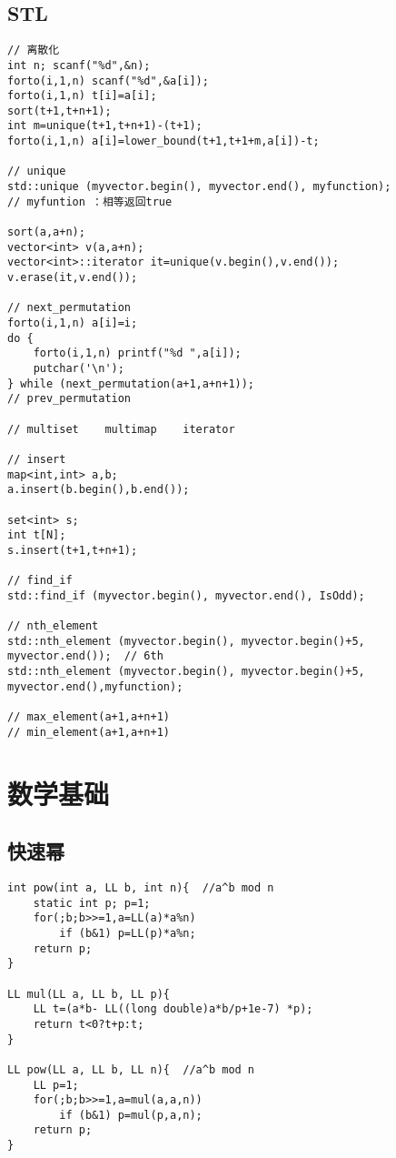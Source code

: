 \documentclass{article}
\begin{document}
\subsection{STL}
\begin{lstlisting}
// 离散化
int n; scanf("%d",&n);
forto(i,1,n) scanf("%d",&a[i]);
forto(i,1,n) t[i]=a[i];
sort(t+1,t+n+1);
int m=unique(t+1,t+n+1)-(t+1);
forto(i,1,n) a[i]=lower_bound(t+1,t+1+m,a[i])-t;

// unique
std::unique (myvector.begin(), myvector.end(), myfunction);
// myfuntion ：相等返回true

sort(a,a+n);
vector<int> v(a,a+n);
vector<int>::iterator it=unique(v.begin(),v.end());
v.erase(it,v.end());

// next_permutation
forto(i,1,n) a[i]=i;
do {
	forto(i,1,n) printf("%d ",a[i]);
	putchar('\n');
} while (next_permutation(a+1,a+n+1));
// prev_permutation

// multiset    multimap    iterator

// insert
map<int,int> a,b;
a.insert(b.begin(),b.end());

set<int> s;
int t[N];
s.insert(t+1,t+n+1);

// find_if
std::find_if (myvector.begin(), myvector.end(), IsOdd);

// nth_element
std::nth_element (myvector.begin(), myvector.begin()+5, myvector.end());  // 6th
std::nth_element (myvector.begin(), myvector.begin()+5, myvector.end(),myfunction);

// max_element(a+1,a+n+1)
// min_element(a+1,a+n+1)
\end{lstlisting}


\section{数学基础}

\subsection{快速幂}
\begin{lstlisting}
int pow(int a, LL b, int n){  //a^b mod n
	static int p; p=1;
	for(;b;b>>=1,a=LL(a)*a%n)
		if (b&1) p=LL(p)*a%n;
    return p;
}

LL mul(LL a, LL b, LL p){
    LL t=(a*b- LL((long double)a*b/p+1e-7) *p);
    return t<0?t+p:t;
}

LL pow(LL a, LL b, LL n){  //a^b mod n
    LL p=1;
    for(;b;b>>=1,a=mul(a,a,n))
		if (b&1) p=mul(p,a,n);
    return p;
}
\end{lstlisting}
\end{document}
